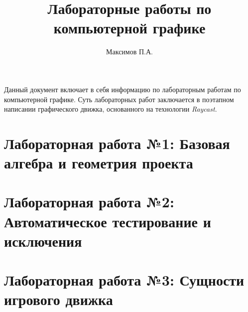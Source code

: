 \documentclass[14pt, a4paper, titlepage]{extarticle}
\title{Лабораторные работы по компьютерной графике}
\author{Максимов П.А.}
\begin{document}
	\maketitle

	\tableofcontents

	\pagebreak

	Данный документ включает в себя информацию по лабораторным работам по компьютерной графике. Суть лабораторных работ заключается в поэтапном написании графического движка, основанного на технологии \textit{Raycast}. 

	\section{Лабораторная работа №1: Базовая алгебра и геометрия проекта}
	
		
	\pagebreak
	\section{Лабораторная работа №2: Автоматическое тестирование и исключения}
	

	\pagebreak
	\section{Лабораторная работа №3: Сущности игрового движка}
	
\end{document}
